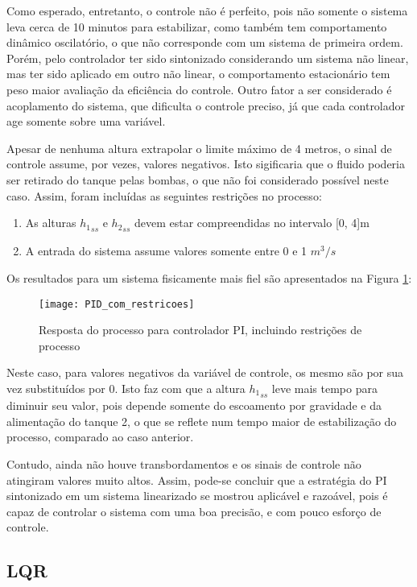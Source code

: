 Como esperado, entretanto, o controle não é perfeito, pois não somente o sistema leva cerca de 10 minutos para estabilizar, como também tem comportamento dinâmico oscilatório, o que não corresponde com um sistema de primeira ordem. Porém, pelo controlador ter sido sintonizado considerando um sistema não linear, mas ter sido aplicado em outro não linear, o comportamento estacionário tem peso maior avaliação da eficiência do controle. Outro fator a ser considerado é acoplamento do sistema, que dificulta o controle preciso, já que cada controlador age somente sobre uma variável.

Apesar de nenhuma altura extrapolar o limite máximo de 4 metros, o sinal de controle assume, por vezes, valores negativos. Isto sigificaria que o fluido poderia ser retirado do tanque pelas bombas, o que não foi considerado possível neste caso. Assim, foram incluídas as seguintes restrições no processo:

\begin{enumerate}
	\item As alturas ${h_1}_{ss}$ e ${h_2}_{ss}$ devem estar compreendidas no intervalo [0, 4]m
	\item A entrada do sistema assume valores somente entre 0 e 1 $m^3/s$
\end{enumerate}

Os resultados para um sistema fisicamente mais fiel são apresentados na Figura \ref{img_pid_com_restricoes}:

\begin{figure}[!htb]
	\centering
	\texttt{[image: PID\_com\_restricoes]}
	\caption{Resposta do processo para controlador PI, incluindo restrições de processo}
	\label{img_pid_com_restricoes}
\end{figure}

Neste caso, para valores negativos da variável de controle, os mesmo são por sua vez substituídos por 0. Isto faz com que a altura ${h_1}_{ss}$ leve mais tempo para diminuir seu valor, pois depende somente do escoamento por gravidade e da alimentação do tanque 2, o que se reflete num tempo maior de estabilização do processo, comparado ao caso anterior.

Contudo, ainda não houve transbordamentos e os sinais de controle não atingiram valores muito altos. Assim, pode-se concluir que a estratégia do PI sintonizado em um sistema linearizado se mostrou aplicável e razoável, pois é capaz de controlar o sistema com uma boa precisão, e com pouco esforço de controle.

\subsection{LQR}

